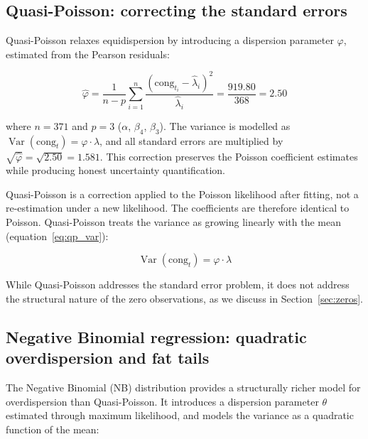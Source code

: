 \documentclass[11pt]{article}
\begin{document}
\subsection{Quasi-Poisson: correcting the standard errors}
 
Quasi-Poisson \citep{McCullagh1989} relaxes equidispersion by
introducing a dispersion parameter $\varphi$, estimated from the Pearson
residuals:
 
\begin{equation}
  \hat\varphi
    = \frac{1}{n-p}
      \sum_{i=1}^{n}
      \frac{(\text{cong}_{t_i} - \hat\lambda_i)^{2}}
           {\hat\lambda_i}
    = \frac{919.80}{368} = 2.50
  \label{eq:phi}
\end{equation}
 
where $n = 371$ and $p = 3$ ($\alpha$, $\beta_4$, $\beta_3$). The
variance is modelled as $\operatorname{Var}(\text{cong}_{t}) = \varphi
\cdot \lambda$, and all standard errors are multiplied by
$\sqrt{\hat\varphi} = \sqrt{2.50} = 1.581$. This correction preserves
the Poisson coefficient estimates while producing honest uncertainty
quantification.
 
Quasi-Poisson is a correction applied to the Poisson likelihood after
fitting, not a re-estimation under a new likelihood. The coefficients
are therefore identical to Poisson. Quasi-Poisson treats the variance as
growing linearly with the mean (equation~\ref{eq:qp_var}):
 
\begin{equation}
  \operatorname{Var}(\text{cong}_{t}) = \varphi \cdot \lambda
  \label{eq:qp_var}
\end{equation}
 
While Quasi-Poisson addresses the standard error problem, it does not
address the structural nature of the zero observations, as we discuss
in Section~\ref{sec:zeros}.
 
\subsection{Negative Binomial regression: quadratic overdispersion
            and fat tails}
 
The Negative Binomial (NB) distribution \citep{Hilbe2011} provides a
structurally richer model for overdispersion than Quasi-Poisson. It
introduces a dispersion parameter $\theta$ estimated through maximum
likelihood, and models the variance as a quadratic function of the mean:
 
\end{document}
